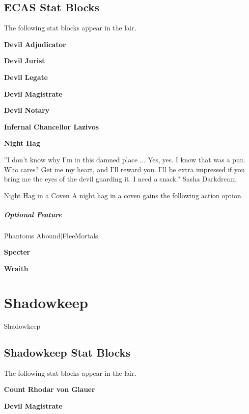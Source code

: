 \documentclass[10pt,a4paper,twoside,bg=print,twocolumn,openany,nodeprecatedcode]{dndbook}
\begin{document}
\section{ECAS Stat Blocks}
The following stat blocks appear in the lair.

\textbf{Devil Adjudicator}

\textbf{Devil Jurist}

\textbf{Devil Legate}

\textbf{Devil Magistrate}

\textbf{Devil Notary}

\textbf{Infernal Chancellor Lazivos}

\textbf{Night Hag}

\DndQuote%
{}
{''I don't know why I'm in this damned place ... Yes, yes. I know that was a pun. Who cares? Get me my heart, and I'll reward you. I'll be extra impressed if you bring me the eyes of the devil guarding it. I need a snack.''}
{Sasha Darkdream}
\begin{DndSidebar}[float=!b]{Night Hag in a Coven}
A night hag in a coven gains the following action option.



\paragraph{Optional Feature}
Phantoms Abound|FleeMortals



\end{DndSidebar}

\textbf{Specter}

\textbf{Wraith}

\chapter{Shadowkeep}
Shadowkeep

\section{Shadowkeep Stat Blocks}
The following stat blocks appear in the lair.

\textbf{Count Rhodar von Glauer}

\textbf{Devil Magistrate}
\end{document}
